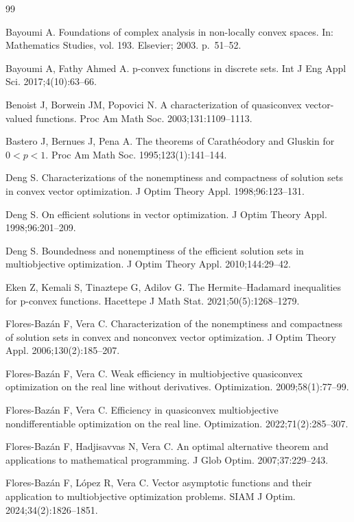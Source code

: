 \documentclass[10pt]{article}
\begin{document}
\begin{thebibliography}{99}

Bayoumi A.
Foundations of complex analysis in non-locally convex spaces.
In: Mathematics Studies, vol. 193.
Elsevier; 2003. p.~51--52.

Bayoumi A, Fathy Ahmed A.
p-convex functions in discrete sets.
Int J Eng Appl Sci. 2017;4(10):63--66.

Benoist J, Borwein JM, Popovici N.
A characterization of quasiconvex vector-valued functions.
Proc Am Math Soc. 2003;131:1109--1113.

Bastero J, Bernues J, Pena A.
The theorems of Carath\'eodory and Gluskin for $0<p<1$.
Proc Am Math Soc. 1995;123(1):141--144.

Deng S.
Characterizations of the nonemptiness and compactness of solution sets in convex vector optimization.
J Optim Theory Appl. 1998;96:123--131.

Deng S.
On efficient solutions in vector optimization.
J Optim Theory Appl. 1998;96:201--209.

Deng S.
Boundedness and nonemptiness of the efficient solution sets in multiobjective optimization.
J Optim Theory Appl. 2010;144:29--42.

Eken Z, Kemali S, Tinaztepe G, Adilov G.
The Hermite--Hadamard inequalities for p-convex functions.
Hacettepe J Math Stat. 2021;50(5):1268--1279.

Flores-Baz\'an F, Vera C.
Characterization of the nonemptiness and compactness of solution sets in convex and nonconvex vector optimization.
J Optim Theory Appl. 2006;130(2):185--207.

Flores-Baz\'an F, Vera C.
Weak efficiency in multiobjective quasiconvex optimization on the real line without derivatives.
Optimization. 2009;58(1):77--99.

Flores-Baz\'an F, Vera C.
Efficiency in quasiconvex multiobjective nondifferentiable optimization on the real line.
Optimization. 2022;71(2):285--307.

Flores-Baz\'an F, Hadjisavvas N, Vera C.
An optimal alternative theorem and applications to mathematical programming.
J Glob Optim. 2007;37:229--243.

Flores-Baz\'an F, L\'opez R, Vera C.
Vector asymptotic functions and their application to multiobjective optimization problems.
SIAM J Optim. 2024;34(2):1826--1851.


\end{thebibliography}
\end{document}
